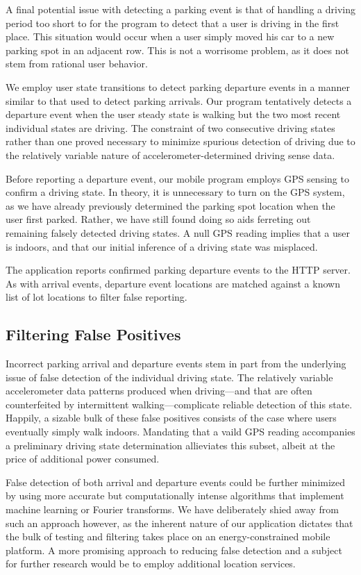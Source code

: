 A final potential issue with detecting a parking event is that of handling a
driving period too short to for the program to detect that a user is driving
in the first place. This situation would occur when a user simply moved his
car to a new parking spot in an adjacent row. This is not a worrisome problem,
as it does not stem from rational user behavior.

We employ user state transitions to detect parking departure events in a
manner similar to that used to detect parking arrivals. Our program
tentatively detects a departure event when the user steady state is walking
but the two most recent individual states are driving. The constraint of two
consecutive driving states rather than one proved necessary to minimize
spurious detection of driving due to the relatively variable nature of
accelerometer-determined driving sense data.

Before reporting a departure event, our mobile program employs GPS sensing to
confirm a driving state. In theory, it is unnecessary to turn on the GPS
system, as we have already previously determined the parking spot location
when the user first parked. Rather, we have still found doing so aids
ferreting out remaining falsely detected driving states. A null GPS reading
implies that a user is indoors, and that our initial inference of a driving
state was misplaced.

The application reports confirmed parking departure events to the HTTP
server. As with arrival events, departure event locations are matched against
a known list of lot locations to filter false reporting.

\subsection{Filtering False Positives}
\label{subsec-false}

Incorrect parking arrival and departure events stem in part from the
underlying issue of false detection of the individual driving state. The
relatively variable accelerometer data patterns produced when driving---and
that are often counterfeited by intermittent walking---complicate reliable
detection of this state. Happily, a sizable bulk of these false positives
consists of the case where users eventually simply walk indoors. Mandating
that a vaild GPS reading accompanies a preliminary driving state
determination allieviates this subset, albeit at the price of additional
power consumed.

False detection of both arrival and departure events could be further
minimized by using more accurate but computationally intense algorithms that
implement machine learning or Fourier transforms. We have deliberately shied
away from such an approach however, as the inherent nature of our application
dictates that the bulk of testing and filtering takes place on an
energy-constrained mobile platform. A more promising approach to reducing
false detection and a subject for further research would be to employ
additional location services.

